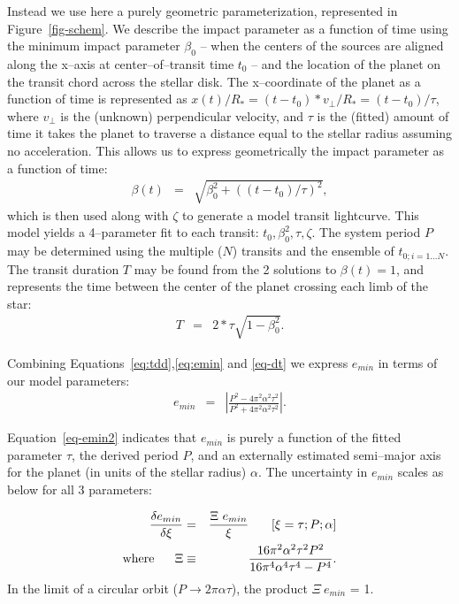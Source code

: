 Instead we use here a purely geometric parameterization, represented
in Figure~\ref{fig-schem}.  We describe the impact parameter as a
function of time using the minimum impact parameter $\beta_0$ -- when
the centers of the sources are aligned along the x--axis at
center--of--transit time $t_0$ -- and the location of the planet on
the transit chord across the stellar disk.  The x--coordinate of the
planet as a function of time is represented as $x(t) / R_* = (t - t_0)
* v_\perp / R_* = (t - t_0) / \tau$, where $v_\perp$ is the (unknown)
perpendicular velocity, and $\tau$ is the (fitted) amount of time it
takes the planet to traverse a distance equal to the stellar radius
assuming no acceleration.  This allows us to express geometrically the
impact parameter as a function of time:
\begin{eqnarray}
\beta(t) & = & \sqrt{\beta_0^2 + \left((t - t_0) / \tau\right)^2},
\end{eqnarray}
which is then used along with $\zeta$ to generate a model transit
lightcurve.
This model yields a 4--parameter fit to each transit: $t_0, \beta_0^2,
\tau, \zeta$.  The system period $P$ may be determined using the
multiple ($N$) transits and the ensemble of $t_{0;i=1...N}$.  The
transit duration $T$ may be found from the 2 solutions to $\beta(t) =
1$, and represents the time between the center of the planet crossing
each limb of the star:
\begin{eqnarray}
T & = & 2 * \tau \sqrt{1 - \beta_0^2}.
\label{eq-dt}
\end{eqnarray}

Combining Equations~\ref{eq:tdd},\ref{eq:emin} and \ref{eq-dt} we express $e_{min}$ in terms of our model
parameters:
\begin{eqnarray}
e_{min} & = & \left| \frac{P^{2} - 4 \pi^{2} \alpha^{2} \tau^{2}}{P^{2} + 4 \pi^{2} \alpha^{2} \tau^{2}} \right|.
\label{eq-emin2}
\end{eqnarray}

Equation~\ref{eq-emin2} indicates that $e_{min}$ is purely a function
of the fitted parameter $\tau$, the derived period $P$, and an
externally estimated semi--major axis for the planet (in units of the
stellar radius) $\alpha$.  The uncertainty in $e_{min}$ scales as
below for all 3 parameters:

\begin{eqnarray}
\frac{\delta e_{min}}{\delta \xi} & = & \frac{\Xi~e_{min}}{\xi} ~~~~~ \left[\xi = \tau; P; \alpha \right] \\
{\rm where}~~~~~\Xi & \equiv & \frac{16 \pi^{2} \alpha^{2} \tau^{2} P^{2}}{16 \pi^{4} \alpha^{4} \tau^{4} - P^{4}}.\nonumber
\label{eq-emin3}
\end{eqnarray}
In the limit of a circular orbit ($P \rightarrow 2 \pi \alpha \tau$),
the product $\Xi~e_{min}$ = 1.

